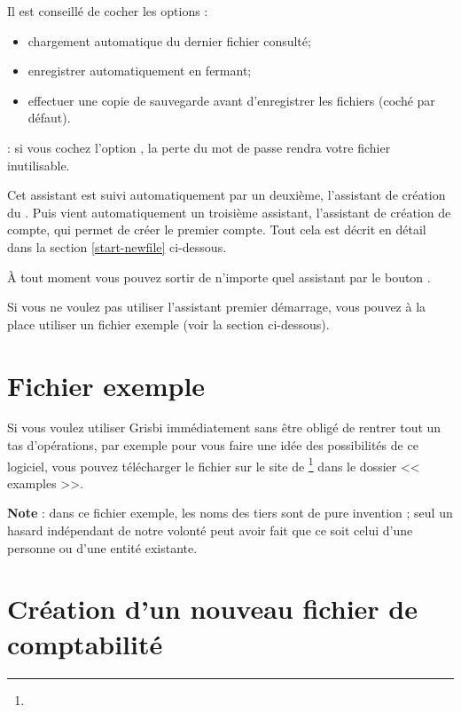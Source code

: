 Il est conseillé de cocher les options :

\begin{itemize}
 \item chargement automatique du dernier fichier consulté;
 \item enregistrer automatiquement en fermant;
 \item effectuer une copie de sauvegarde avant d'enregistrer les fichiers (coché par défaut).
\end{itemize}

\textcolor{red}{}: si vous cochez l'option , la perte du mot de passe rendra votre fichier inutilisable.

Cet assistant est suivi automatiquement par un deuxième, l'assistant de création du . Puis vient automatiquement un troisième assistant, l'assistant de création de compte, qui permet de créer le premier compte. Tout cela est décrit en détail dans la section \ref{start-newfile} ci-dessous.

À tout moment vous pouvez sortir de n'importe quel assistant par le bouton .

Si vous ne voulez pas utiliser l'assistant premier démarrage, vous pouvez à la
place utiliser un fichier exemple (voir la section ci-dessous).


\section{Fichier exemple\label{start-example}}


Si vous voulez utiliser Grisbi immédiatement sans être obligé de rentrer tout un tas d'opérations, par exemple pour vous faire une idée des possibilités de ce logiciel, vous pouvez télécharger le fichier  sur le site de \footnote{\urlSourceForgeDocumentation{}} dans le dossier << \textsf{examples} >>.

\textbf{Note} : dans ce fichier exemple, les noms des tiers sont de pure invention ; seul un hasard indépendant de notre volonté peut avoir fait que ce soit celui d'une personne ou d'une entité existante.


\section{Création d'un nouveau fichier de comptabilité\label{start-newfile}}


